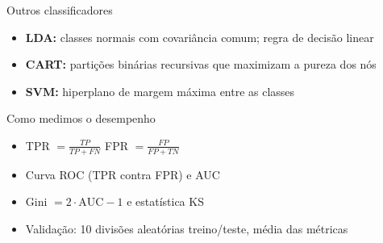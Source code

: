 \begin{frame}{Outros classificadores}
  \begin{itemize}
    \item \textbf{LDA:} classes normais com covariância comum; regra de decisão linear
    \item \textbf{CART:} partições binárias recursivas que maximizam a pureza dos nós
    \item \textbf{SVM:} hiperplano de margem máxima entre as classes
  \end{itemize}
\end{frame}

\begin{frame}{Como medimos o desempenho}
  \begin{itemize}
    \item TPR $= \frac{TP}{TP+FN}$ \quad FPR $= \frac{FP}{FP+TN}$
    \item Curva ROC (TPR contra FPR) e AUC
    \item Gini $= 2\cdot\text{AUC} - 1$ e estatística KS
    \item Validação: 10 divisões aleatórias treino/teste, média das métricas
  \end{itemize}
\end{frame}
